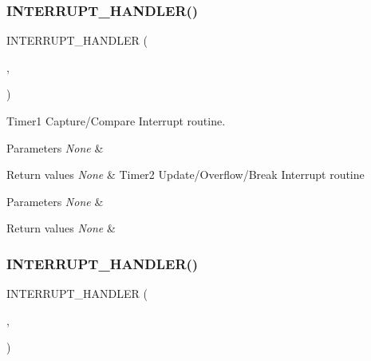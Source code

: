\subsubsection{\texorpdfstring{I\+N\+T\+E\+R\+R\+U\+P\+T\+\_\+\+H\+A\+N\+D\+L\+E\+R()}{INTERRUPT\_HANDLER()}\hspace{0.1cm}{\footnotesize\ttfamily [11/16]}}
{\footnotesize\ttfamily I\+N\+T\+E\+R\+R\+U\+P\+T\+\_\+\+H\+A\+N\+D\+L\+ER (\begin{DoxyParamCaption}\item[{T\+I\+M2\+\_\+\+U\+P\+D\+\_\+\+O\+V\+F\+\_\+\+B\+R\+K\+\_\+\+I\+R\+Q\+Handler}]{,  }\item[{13}]{ }\end{DoxyParamCaption})}



Timer1 Capture/\+Compare Interrupt routine. 


\begin{DoxyParams}{Parameters}
{\em None} & \\
\hline
\end{DoxyParams}

\begin{DoxyRetVals}{Return values}
{\em None} & Timer2 Update/\+Overflow/\+Break Interrupt routine \\
\hline
\end{DoxyRetVals}

\begin{DoxyParams}{Parameters}
{\em None} & \\
\hline
\end{DoxyParams}

\begin{DoxyRetVals}{Return values}
{\em None} & \\
\hline
\end{DoxyRetVals}
\mbox{\label{group___u_a_r_t1___printf_gad0ff5a598eb3e67db7e293f84c5f5de2}} 
\subsubsection{\texorpdfstring{I\+N\+T\+E\+R\+R\+U\+P\+T\+\_\+\+H\+A\+N\+D\+L\+E\+R()}{INTERRUPT\_HANDLER()}\hspace{0.1cm}{\footnotesize\ttfamily [12/16]}}
{\footnotesize\ttfamily I\+N\+T\+E\+R\+R\+U\+P\+T\+\_\+\+H\+A\+N\+D\+L\+ER (\begin{DoxyParamCaption}\item[{T\+I\+M2\+\_\+\+C\+A\+P\+\_\+\+C\+O\+M\+\_\+\+I\+R\+Q\+Handler}]{,  }\item[{14}]{ }\end{DoxyParamCaption})}



